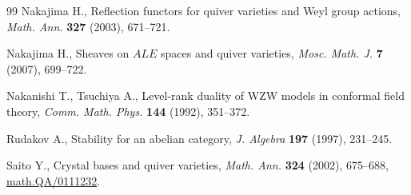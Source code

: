 \documentclass[10pt,a4paper]{amsart}
\theoremstyle{definition}
\numberwithin{equation}{section}
\begin{document}
\begin{thebibliography}{99}
Nakajima H.,  Ref\/lection functors for quiver varieties and {W}eyl group
  actions, {\it Math. Ann.} \textbf{327} (2003), 671--721.

Nakajima H.,  Sheaves on $ALE$ spaces and quiver varieties, {\it Mosc. Math. J.}
  \textbf{7} (2007),  699--722.

Nakanishi T., Tsuchiya A.,  Level-rank duality of {WZW} models in
  conformal f\/ield theory, {\it Comm. Math. Phys.} \textbf{144} (1992),
  351--372. %

Rudakov A.,  Stability for an abelian category, {\it J. Algebra} \textbf{197}
  (1997),   231--245. %

Saito Y., Crystal bases and quiver varieties, {\it Math. Ann.} \textbf{324}
  (2002),  675--688, \href{http://arxiv.org/abs/math.QA/0111232}{math.QA/0111232}. %


\end{thebibliography}
\end{document}

